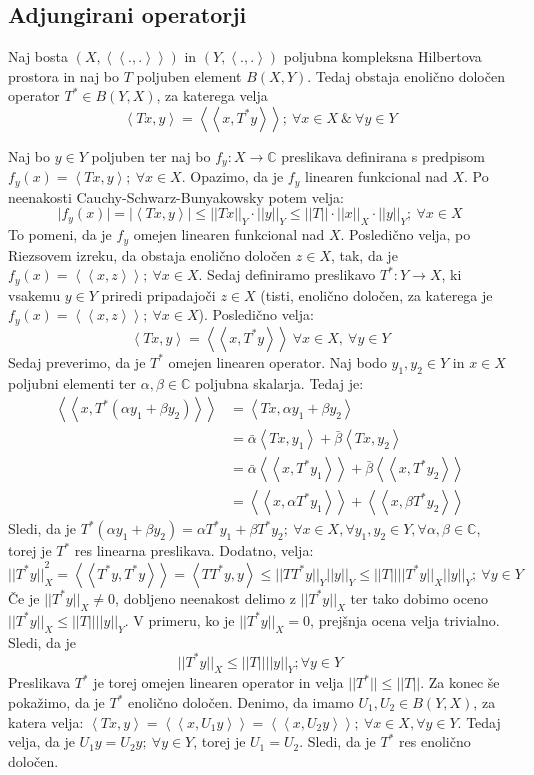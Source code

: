 \documentclass[mat2]{matdelo}
\newcommand{\C}{\mathbb{C}}
\newcommand{\abs}[1]{\ensuremath{\lvert #1 \rvert}}
\newcommand{\norm}[1]{\abs{\abs{#1}}}
\newcommand{\Sp}[2]{\ensuremath{\left<#1, #2\right>}}
\newcommand{\Spp}[2]{\ensuremath{\left<\left<#1, #2\right>\right>}}
\newcommand{\map}[3]{\ensuremath{{#1}:{#2}\rightarrow{#3}}}
\begin{document}
		\subsection{Adjungirani operatorji}
			\begin{izrek}
				\label{izr:Adjexist}
				Naj bosta $(X, \Spp{.}{.})$ in $(Y, \Sp{.}{.})$ poljubna kompleksna Hilbertova prostora in naj bo $T$ poljuben element $B(X, Y)$. Tedaj obstaja enolično določen operator $T^*\in B(Y, X)$, za katerega velja $$\Sp{Tx}{y} = \Spp{x}{T^*y};~\forall x\in X~\&~\forall y \in Y $$
			\end{izrek}
			\begin{dokaz}
				Naj bo $y\in Y$ poljuben ter naj bo $\map{f_y}{X}{\C}$ preslikava definirana s predpisom $f_y(x) = \Sp{Tx}{y};~\forall x\in X$. Opazimo, da je $f_y$ linearen funkcional nad $X$. Po neenakosti Cauchy-Schwarz-Bunyakowsky potem velja: $$\abs{f_y(x)} = \abs{\Sp{Tx}{y}} \leq \norm{Tx}_Y \cdot \norm{y}_Y \leq \norm{T}\cdot\norm{x}_X\cdot\norm{y}_Y;~ \forall x\in X$$ To pomeni, da je $f_y$ omejen linearen funkcional nad $X$. Posledično velja, po Riezsovem izreku, da obstaja enolično določen $z\in X$, tak, da je $f_y(x) = \Spp{x}{z};~\forall x\in X$. Sedaj definiramo preslikavo $\map{T^*}{Y}{X}$, ki vsakemu $y\in Y$ priredi pripadajoči $z\in X$ (tisti, enolično določen, za katerega je $f_y(x) = \Spp{x}{z};~\forall x\in X$). Posledično velja: $$\Sp{Tx}{y}=\Spp{x}{T^*y}~\forall x\in X,~\forall y\in Y$$
				Sedaj preverimo, da je $T^*$ omejen linearen operator. Naj bodo $y_1, y_2 \in Y$ in $x\in X$ poljubni elementi ter $\alpha, \beta \in \C$ poljubna skalarja. Tedaj je: \begin{align*}
					\Spp{x}{T^*(\alpha y_1 + \beta y_2)} &= \Sp{Tx}{\alpha y_1 + \beta y_2} \\
					&= \bar{\alpha}\Sp{Tx}{y_1} + \bar{\beta}\Sp{Tx}{y_2} \\
					&= \bar{\alpha}\Spp{x}{T^*y_1} + \bar{\beta}\Spp{x}{T^*y_2} \\
					&= \Spp{x}{\alpha T^*y_1} + \Spp{x}{\beta T^*y_2}
				\end{align*}
				Sledi, da je $T^*(\alpha y_1 + \beta y_2)=\alpha T^*y_1 + \beta T^*y_2;~\forall x\in X, \forall y_1, y_2 \in Y, \forall \alpha, \beta \in \C$, torej je $T^*$ res linearna preslikava. Dodatno, velja: $$\norm{T^*y}_X^2 = \Spp{T^*y}{T^*y} = \Sp{TT^*y}{y} \leq \norm{TT^*y}_Y\norm{y}_Y \leq \norm{T}\norm{T^*y}_X\norm{y}_Y;~\forall y\in Y$$
				Če je $\norm{T^*y}_X \neq 0$, dobljeno neenakost delimo z $\norm{T^*y}_X$ ter tako dobimo oceno $\norm{T^*y}_X \leq \norm{T}\norm{y}_Y$. V primeru, ko je $\norm{T^*y}_X = 0$, prejšnja ocena velja trivialno. Sledi, da je $$\norm{T^*y}_X \leq \norm{T}\norm{y}_Y; \forall y\in Y$$
				Preslikava $T^*$ je torej omejen linearen operator in velja $\norm{T^*}\leq \norm{T}$. Za konec še pokažimo, da je $T^*$ enolično določen. Denimo, da imamo $U_1, U_2 \in B(Y, X)$, za katera velja: $\Sp{Tx}{y} = \Spp{x}{U_1 y} = \Spp{x}{U_2 y};~\forall x\in X, \forall y\in Y$. Tedaj velja, da je $U_1y = U_2y;~\forall y\in Y$, torej je $U_1 = U_2$. Sledi, da je $T^*$ res enolično določen.
			\end{dokaz}
			
\end{document}
